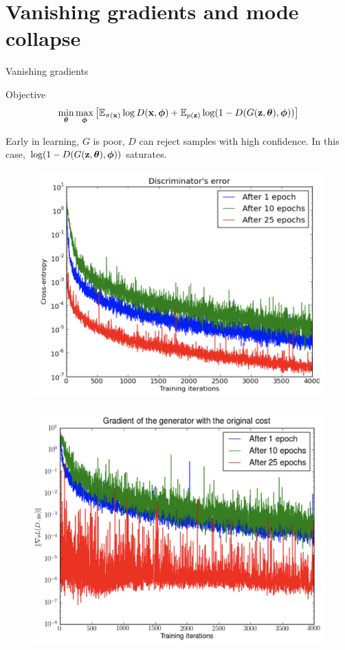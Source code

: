 \section{Vanishing gradients and mode collapse}
\begin{frame}{Vanishing gradients}
	\vspace{-0.2cm}
	\begin{block}{Objective}
		\vspace{-0.8cm}
		\[
		\min_{\boldsymbol{\theta}} \max_{\boldsymbol{\phi}} \left[ \mathbb{E}_{\pi(\mathbf{x})} \log D(\mathbf{x}, \boldsymbol{\phi}) + \mathbb{E}_{p(\mathbf{z})} \log (1 - D(G(\mathbf{z}, \boldsymbol{\theta}), \boldsymbol{\phi})) \right]
		\]
		\vspace{-0.6cm}
	\end{block}
	Early in learning, $G$ is poor, $D$ can reject samples with high confidence. In this case, $\log (1 - D(G(\mathbf{z}, \boldsymbol{\theta}), \boldsymbol{\phi}))$ saturates.
	\begin{minipage}[t]{0.5\columnwidth}
		\begin{figure}
			\centering
			\includegraphics[width=0.9\linewidth]{figs/vanishing_gradients_1}
		\end{figure}
	\end{minipage}%
	\begin{minipage}[t]{0.5\columnwidth}
		\begin{figure}
			\centering
			\includegraphics[width=0.9\linewidth]{figs/vanishing_gradients_2}

\end{figure}
\end{minipage}
\end{frame}
